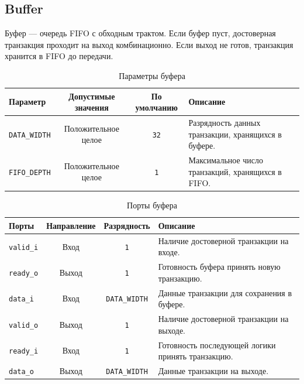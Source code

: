
\subsection{Buffer}
\label{subsec:buffer}

Буфер --- очередь FIFO с обходным трактом. Если буфер пуст, достоверная транзакция проходит на выход комбинационно. Если выход не готов, транзакция хранится в FIFO до передачи.

\begin{table}[H]
	\centering
	\small
	\begin{tabularx}{\textwidth}{l c c X}
		\toprule
		\textbf{Параметр} & \textbf{Допустимые значения} & \textbf{По умолчанию} & \textbf{Описание} \\
		\midrule
		
		\verb|DATA_WIDTH| &
		Положительное целое &
		\verb|32| &
		Разрядность данных транзакции, хранящихся в буфере. \\
		
		\verb|FIFO_DEPTH| &
		Положительное целое &
		\verb|1| &
		Максимальное число транзакций, хранящихся в FIFO. \\
		
		\bottomrule
	\end{tabularx}
	\caption{Параметры буфера}
	\label{tab:buffer_parameters}
\end{table}

\begin{table}[H]
	\centering
	\small
	\begin{tabularx}{\textwidth}{l c c X}
		\toprule
		\textbf{Порты} & \textbf{Направление} & \textbf{Разрядность} & \textbf{Описание} \\
		\midrule
		
		\verb|valid_i| &
		Вход &
		\verb|1| &
		Наличие достоверной транзакции на входе. \\
		
		\verb|ready_o| &
		Выход &
		\verb|1| &
		Готовность буфера принять новую транзакцию. \\
		
		\verb|data_i| &
		Вход &
		\verb|DATA_WIDTH| &
		Данные транзакции для сохранения в буфере. \\
		
		\verb|valid_o| &
		Выход &
		\verb|1| &
		Наличие достоверной транзакции на выходе. \\
		
		\verb|ready_i| &
		Вход &
		\verb|1| &
		Готовность последующей логики принять транзакцию. \\
		
		\verb|data_o| &
		Выход &
		\verb|DATA_WIDTH| &
		Данные транзакции на выходе. \\
		
		\bottomrule
	\end{tabularx}
	\caption{Порты буфера}
	\label{tab:buffer_ports}
\end{table}
